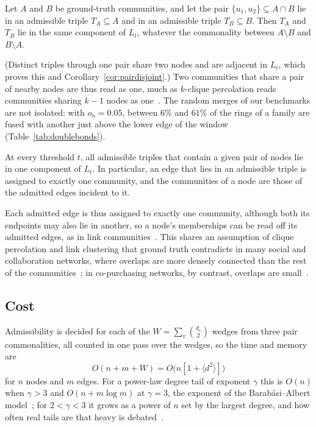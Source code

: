 \begin{proposition}
\label{prop:sharedpairs}
Let $A$ and $B$ be ground-truth communities, and let the pair $\{u_1,u_2\}\subseteq
A\cap B$ lie in an admissible triple $T_A\subseteq A$ and in an admissible triple
$T_B\subseteq B$. Then $T_A$ and $T_B$ lie in the same component of $L_t$, whatever the
commonality between $A\setminus B$ and $B\setminus A$.
\end{proposition}
(Distinct triples through one pair share two nodes and are adjacent in $L_t$, which proves this and Corollary~\ref{cor:pairdisjoint}.) Two communities that share a pair of nearby nodes are thus read as one, much as
$k$-clique percolation reads communities sharing $k-1$ nodes as
one~\cite{palla2005uncovering}. The random merges of our benchmarks are not isolated:
with $o_n=0.05$, between $6\%$ and $61\%$ of the rings of a family are fused with
another just above the lower edge of the window (Table~\ref{tab:doublebonds}).

\begin{corollary}
\label{cor:pairdisjoint}
At every threshold $t$, all admissible triples that contain a given pair of nodes lie in
one component of $L_t$. In particular, an edge that lies in an admissible triple is
assigned to exactly one community, and the communities of a node are those of the
admitted edges incident to it.
\end{corollary}
Each admitted edge is thus assigned to exactly one community, although both its endpoints
may also lie in another, so a node's memberships can be read off its admitted edges, as in link communities~\cite{ahn2010link,evans2009line}. This shares an
assumption of clique percolation and link clustering that ground truth contradicts in
many social and collaboration networks, where overlaps are more densely connected than
the rest of the communities~\cite{yang2014structure,yang2012community}; in co-purchasing
networks, by contrast, overlaps are small~\cite{yang2014overlapping}.

\subsection{Cost}
\label{sec:cost}

Admissibility is decided for each of the $W=\sum_v\binom{d_v}{2}$ wedges from three pair
commonalities, all counted in one pass over the wedges, so the time and memory are
\begin{equation}
  O(n+m+W)=O\bigl(n[1+\langle d^2\rangle]\bigr)
  \label{eq:cost}
\end{equation}
for $n$ nodes and $m$ edges. For a power-law degree tail of exponent $\gamma$ this is
$O(n)$ when $\gamma>3$ and $O(n+m\log m)$ at $\gamma=3$, the exponent of the
Barab\'asi--Albert model~\cite{albert2002statistical}; for $2<\gamma<3$ it grows as a
power of $n$ set by the largest degree, and how often real tails are that heavy is
debated~\cite{broido2019scale,voitalov2019scale}.

